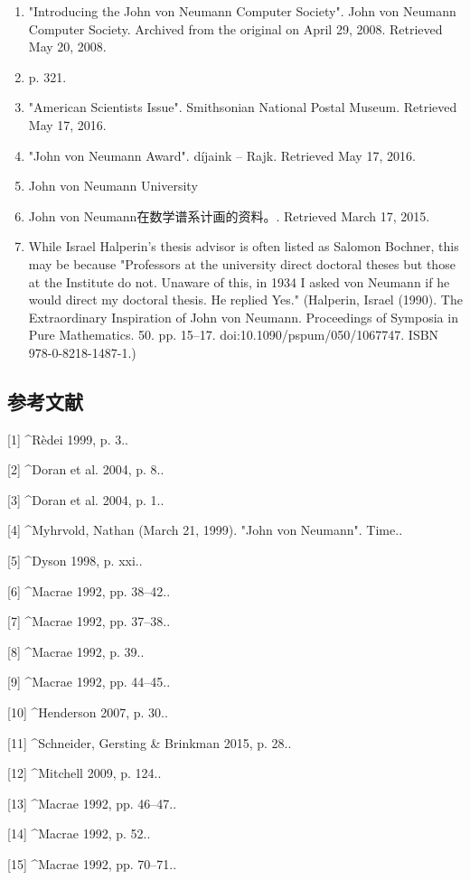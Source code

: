 \begin{enumerate}
\item "Introducing the John von Neumann Computer Society". John von Neumann Computer Society. Archived from the original on April 29, 2008. Retrieved May 20, 2008.
\item  p. 321.
\item "American Scientists Issue". Smithsonian National Postal Museum. Retrieved May 17, 2016.
\item "John von Neumann Award". díjaink – Rajk. Retrieved May 17, 2016.
\item John von Neumann University
\item John von Neumann在数学谱系计画的资料。. Retrieved March 17, 2015.
\item While Israel Halperin's thesis advisor is often listed as Salomon Bochner, this may be because "Professors at the university direct doctoral theses but those at the Institute do not. Unaware of this, in 1934 I asked von Neumann if he would direct my doctoral thesis. He replied Yes." (Halperin, Israel (1990). The Extraordinary Inspiration of John von Neumann. Proceedings of Symposia in Pure Mathematics. 50. pp. 15–17. doi:10.1090/pspum/050/1067747. ISBN 978-0-8218-1487-1.)
\end{enumerate}

\subsection{参考文献}
[1]
^Rèdei 1999, p. 3..

[2]
^Doran et al. 2004, p. 8..

[3]
^Doran et al. 2004, p. 1..

[4]
^Myhrvold, Nathan (March 21, 1999). "John von Neumann". Time..

[5]
^Dyson 1998, p. xxi..

[6]
^Macrae 1992, pp. 38–42..

[7]
^Macrae 1992, pp. 37–38..

[8]
^Macrae 1992, p. 39..

[9]
^Macrae 1992, pp. 44–45..

[10]
^Henderson 2007, p. 30..

[11]
^Schneider, Gersting & Brinkman 2015, p. 28..

[12]
^Mitchell 2009, p. 124..

[13]
^Macrae 1992, pp. 46–47..

[14]
^Macrae 1992, p. 52..

[15]
^Macrae 1992, pp. 70–71..

